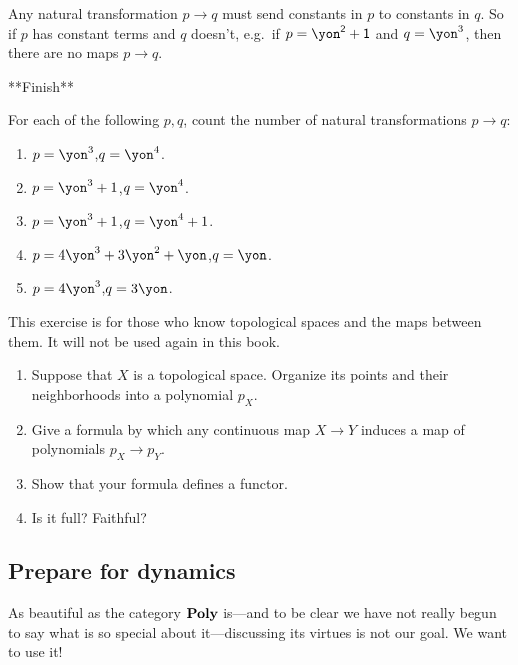 \documentclass[Book-Poly]{subfiles}
\begin{document}
\begin{example}\label{ex.const_to_const}
Any natural transformation $p\to q$ must send constants in $p$ to constants in $q$. So if $p$ has constant terms and $q$ doesn't, e.g.\ if $p=\yon^\2+\1$ and $q=\yon^3$, then there are no maps $p\to q$. 

**Finish**
\end{example}

\begin{exercise}
For each of the following $p,q$, count the number of natural transformations $p\to q$:
\begin{enumerate}
	\item $p=\yon^3$,\quad $q=\yon^4$.
	\item $p=\yon^3+1$,\quad $q=\yon^4$.
	\item $p=\yon^3+1$,\quad $q=\yon^4+1$.
	\item $p=4\yon^3+3\yon^2+\yon$,\quad $q=\yon$.
	\item $p=4\yon^3$,\quad $q=3\yon$.
\qedhere
\end{enumerate}
\end{exercise}

\begin{exercise}
This exercise is for those who know topological spaces and the maps between them. It will not be used again in this book.
\begin{enumerate}
	\item Suppose that $X$ is a topological space. Organize its points and their neighborhoods into a polynomial $p_X$.
	\item Give a formula by which any continuous map $X\to Y$ induces a map of polynomials $p_X\to p_Y$.
	\item Show that your formula defines a functor.
	\item Is it full? Faithful?
\qedhere
\end{enumerate}
\end{exercise}

\subsection{Prepare for dynamics}\label{subsec_prepare_dyn}

As beautiful as the category $\textbf{Poly}$ is---and to be clear we have not really begun to say what is so special about it---discussing its virtues is not our goal. We want to use it!
\end{document}
